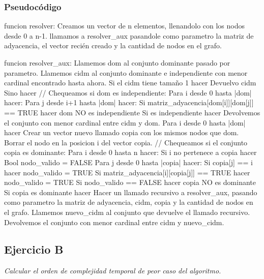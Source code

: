 \subsubsection{Pseudocódigo}
\begin{codesnippet}
funcion resolver:
    Creamos un vector de n elementos, llenandolo con los nodos desde 0 a n-1.
    llamamos a resolver_aux pasandole como parametro la matriz de adyacencia, el vector
        recién creado y la cantidad de nodos en el grafo.

funcion resolver_aux:
    Llamemos dom al conjunto dominante pasado por parametro.
    Llamemos cidm al conjunto dominante e independiente con menor cardinal encontrado
        hasta ahora.
    Si el cidm tiene tamaño 1 hacer
        Devuelvo cidm
    Sino hacer
        // Chequeamos si dom es independiente:
        Para i desde 0 hasta |dom| hacer:
            Para j desde i+1 hasta |dom| hacer:
                Si matriz_adyacencia[dom[i]][dom[j]] == TRUE hacer
                    dom NO es independiente
        Si es independiente hacer
            Devolvemos el conjunto con menor cardinal entre cidm y dom.
    Para i desde 0 hasta |dom| hacer
        Crear un vector nuevo llamado copia con los mismos nodos que dom.
        Borrar el nodo en la posicion i del vector copia.
        // Chequeamos si el conjunto copia es dominante:
        Para i desde 0 hasta n hacer:
            Si i no pertenece a copia hacer
                Bool nodo_valido = FALSE
                Para j desde 0 hasta |copia| hacer:
                    Si copia[j] == i hacer
                        nodo_valido = TRUE
                    Si matriz_adyacencia[i][copia[j]] == TRUE hacer
                        nodo_valido = TRUE
                Si nodo_valido == FALSE hacer
                    copia NO es dominante
        Si copia es dominante hacer
            Hacer un llamado recursivo a resolver_aux, pasando como parametro la matriz
                de adyacencia, cidm, copia y la cantidad de nodos en el grafo.
            Llamemos nuevo_cidm al conjunto que devuelve el llamado recursivo.
            Devolvemos el conjunto con menor cardinal entre cidm y nuevo_cidm.
\end{codesnippet}

\subsection{Ejercicio B}

\textit{Calcular el orden de complejidad temporal de peor caso del algoritmo.}
\medskip

